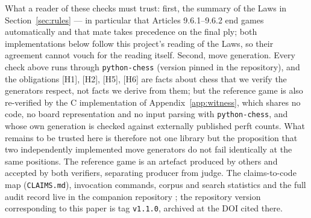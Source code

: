 \documentclass[11pt]{article}
\theoremstyle{definition}
\theoremstyle{remark}
\theoremstyle{plain}
\begin{document}
What a reader of these checks must trust: first, the summary of the
Laws in Section~\ref{sec:rules} --- in particular that Articles
9.6.1--9.6.2 end games automatically and that mate takes precedence on
the final ply; both implementations below follow this project's reading
of the Laws, so their agreement cannot vouch for the reading itself.
Second, move generation. Every check above runs through
\texttt{python-chess} \cite{pythonchess} (version pinned in the
repository), and the obligations [H1], [H2], [H5], [H6] are facts about
chess that we verify the generators respect, not facts we derive from
them; but the reference game is also re-verified by the C
implementation of Appendix~\ref{app:witness}, which shares no code, no
board representation and no input parsing with \texttt{python-chess},
and whose own generation is checked against externally published perft
counts. What remains to be trusted here is therefore not one library
but the proposition that two independently implemented move generators
do not fail identically at the same positions. The reference game is an
artefact produced by others \cite{murphy2020longest} and accepted by
both verifiers, separating producer from judge.
The claims-to-code map (\texttt{CLAIMS.md}), invocation commands, corpus
and search statistics and the full audit record live in the companion
repository \cite{repo}; the repository version corresponding to this
paper is tag \texttt{v1.1.0}, archived at the DOI cited there.
\end{document}
